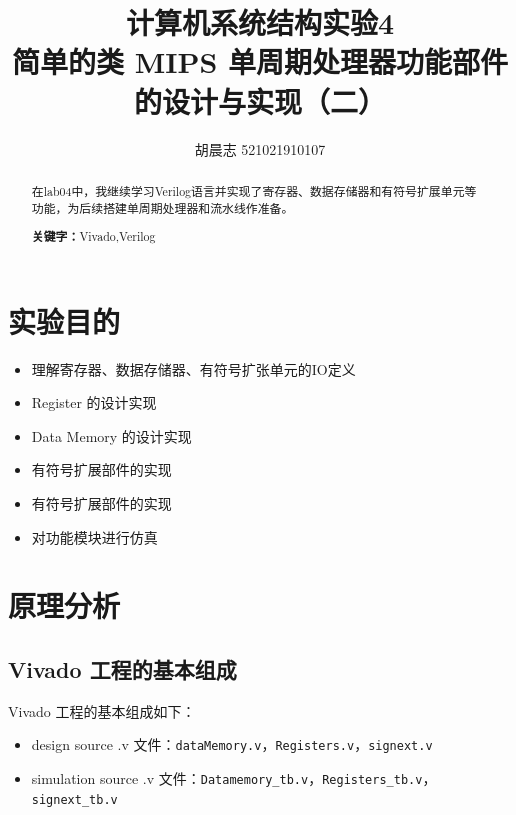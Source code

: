 \documentclass{progartcn}
\title{\bfseries\sffamily
  计算机系统结构实验4 \\ 简单的类 MIPS 单周期处理器功能部件的设计与实现（二）
}
\author{胡晨志 521021910107}
\date{}
\begin{document}
\sloppy %


\maketitle
\thispagestyle{empty}

\begin{abstract}
\noindent 在lab04中，我继续学习Verilog语言并实现了寄存器、数据存储器和有符号扩展单元等功能，为后续搭建单周期处理器和流水线作准备。

\vspace{2ex}
\noindent \textbf{关键字：}Vivado,\hspace{.5em}Verilog
\end{abstract}

\tableofcontents

\setcounter{page}{0}
\newpage

\section{实验目的}

\begin{itemize}
  \item 理解寄存器、数据存储器、有符号扩张单元的IO定义
  \item Register 的设计实现
  \item Data Memory 的设计实现
  \item 有符号扩展部件的实现
  \item 有符号扩展部件的实现
  \item 对功能模块进行仿真
\end{itemize}

\section{原理分析}

\subsection{Vivado 工程的基本组成}

Vivado 工程的基本组成如下：

\begin{itemize}
  \item design source .v 文件：\verb|dataMemory.v|，\verb|Registers.v|，\verb|signext.v|
  \item simulation source .v 文件：\verb|Datamemory_tb.v|，\verb|Registers_tb.v|，\verb|signext_tb.v|
\end{itemize}
\end{document}
